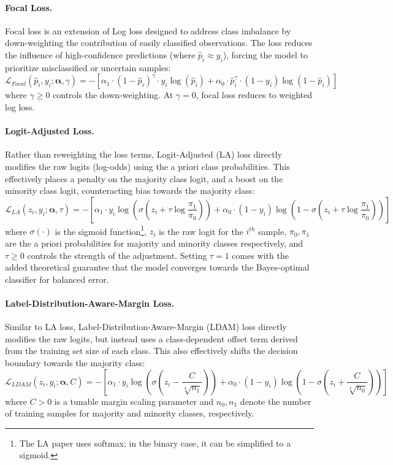 \documentclass{article}
\begin{document}
\paragraph{Focal Loss.}
Focal loss is an extension of Log loss designed to address class imbalance by down-weighting the contribution of easily classified observations. \cite{focal} The loss reduces the influence of high-confidence predictions (where $\hat p_i \approx y_i$), forcing the model to prioritize misclassified or uncertain samples:
$$\mathcal{L}_{Focal}(\hat p_i, y_i; \boldsymbol{\alpha}, \gamma)=-\left[\alpha_1 \cdot(1-\hat p_i)^\gamma \cdot y_i\log(\hat p_i) + \alpha_0 \cdot \hat p_i^\gamma \cdot (1-y_i)\log(1-\hat p_i)\right]$$
where $\gamma \ge 0$ controls the down-weighting. At $\gamma=0$, focal loss reduces to weighted log loss.

\paragraph{Logit-Adjusted Loss.}
Rather than reweighting the loss terms, Logit-Adjusted (LA) loss directly modifies the raw logits (log-odds) using the a priori class probabilities.\cite{LA} This effectively places a penalty on the majority class logit, and a boost on the minority class logit, counteracting bias towards the majority class:
$$
\mathcal{L}_{LA}(z_i, y_i ;\boldsymbol{\alpha}, \tau) = - \left[\alpha_1 \cdot y_i \log\left(\sigma(z_i + \tau \log \frac{\pi_1}{\pi_0})\right) + \alpha_0 \cdot (1-y_i) \log\left(1-\sigma(z_i + \tau \log\frac{\pi_1}{\pi_0})\right) \right]
$$
where $\sigma(\cdot)$ is the sigmoid function\footnote{The LA paper uses softmax; in the binary case, it can be simplified to a sigmoid.}, $z_i$ is the raw logit for the $i^{th}$ sample, $\pi_0, \pi_1$ are the a priori probabilities for majority and minority classes respectively, and $\tau\ge0$ controls the strength of the adjustment. Setting $\tau=1$ comes with the added theoretical guarantee that the model converges towards the Bayes-optimal classifier for balanced error.\cite{LA}

\paragraph{Label-Distribution-Aware-Margin Loss.}
Similar to LA loss, Label-Distribution-Aware-Margin (LDAM) loss directly modifies the raw logits, but instead uses a class-dependent offset term derived from the training set size of each class.\cite{LDAM} This also effectively shifts the decision boundary towards the majority class:
$$\mathcal{L}_{LDAM}(z_i, y_i ;\boldsymbol{\alpha}, C) = - \left[\alpha_1 \cdot y_i \log\left(\sigma(z_i - \frac{C}{\sqrt[4]{n_1}})\right) + \alpha_0 \cdot (1-y_i) \log\left(1-\sigma(z_i + \frac{C}{\sqrt[4]{n_0}})\right) \right]
$$
where $C>0$ is a tunable margin scaling parameter and $n_0,n_1$ denote the number of training samples for majority and minority classes, respectively.
\end{document}
